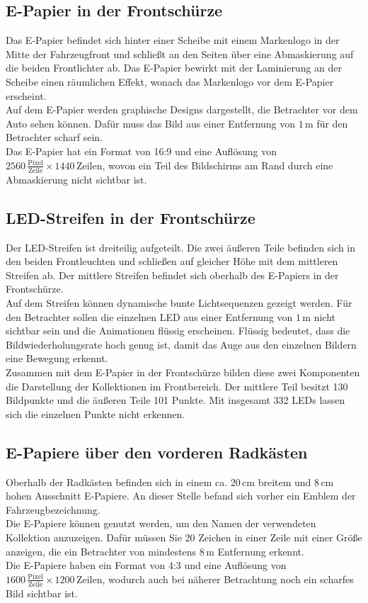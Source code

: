 \subsection{E-Papier in der Frontschürze}
Das E-Papier befindet sich hinter einer Scheibe mit einem Markenlogo in der Mitte der Fahrzeugfront und schließt an den Seiten über eine Abmaskierung auf die beiden Frontlichter ab. Das E-Papier bewirkt mit der Laminierung an der Scheibe einen räumlichen Effekt, wonach das Markenlogo vor dem E-Papier erscheint. \\
Auf dem E-Papier werden graphische Designs dargestellt, die Betrachter vor dem Auto sehen können. Dafür muss das Bild aus einer Entfernung von $ 1\,\mathrm{m} $  für den Betrachter scharf sein. \\
Das E-Papier hat ein Format von 16:9 und eine Auflösung von  $ 2560\,\frac{\mathrm{Pixel}}{\mathrm{Zeile}} \times 1440\,\mathrm{Zeilen} $, wovon ein Teil des Bildschirms am Rand durch eine Abmaskierung nicht sichtbar ist.
\subsection{LED-Streifen in der Frontschürze}
Der LED-Streifen ist dreiteilig aufgeteilt. Die zwei äußeren Teile befinden sich in den beiden Frontleuchten und schließen auf gleicher Höhe mit dem mittleren Streifen ab. Der mittlere Streifen befindet sich oberhalb des E-Papiers in der Frontschürze. \\
Auf dem Streifen können dynamische bunte Lichtsequenzen gezeigt werden. Für den Betrachter sollen die einzelnen LED aus einer Entfernung von $ 1\,\mathrm{m} $ nicht sichtbar sein und die Animationen flüssig erscheinen. Flüssig bedeutet, dass die Bildwiederholungsrate hoch genug ist, damit das Auge aus den einzelnen Bildern eine Bewegung erkennt. \\
Zusammen mit dem E-Papier in der Frontschürze bilden diese zwei
Komponenten die Darstellung der Kollektionen im Frontbereich. Der mittlere Teil besitzt 130 Bildpunkte und die äußeren Teile 101 Punkte. Mit insgesamt 332 LEDs lassen sich die einzelnen Punkte nicht erkennen.
\subsection{E-Papiere über den vorderen Radkästen}
Oberhalb der Radkästen befinden sich in einem ca. $ 20\,\mathrm{cm} $ breitem und $ 8\,\mathrm{cm} $ hohen Ausschnitt E-Papiere. An dieser Stelle befand sich vorher ein Emblem der Fahrzeugbezeichnung. \\
Die E-Papiere können genutzt werden, um den Namen der verwendeten Kollektion anzuzeigen. Dafür müssen Sie 20 Zeichen in einer Zeile mit einer Größe anzeigen, die ein Betrachter von mindestens $ 8\,\mathrm{m} $ Entfernung erkennt. \\
Die E-Papiere haben ein Format von 4:3 und eine Auflösung von $ 1600\,\frac{\mathrm{Pixel}}{\mathrm{Zeile}} \times 1200\,\mathrm{Zeilen} $, wodurch auch bei näherer Betrachtung noch ein scharfes Bild sichtbar ist.
